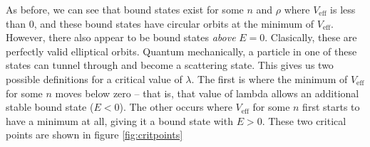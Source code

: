 \documentclass[12pt,twoside]{reedthesis}
\begin{document}
As before, we can see that bound states exist for some $n$ and $\rho$ where $V_{\mathrm{eff}}$ is less than 0, and these bound states have circular orbits at the minimum of $V_{\mathrm{eff}}$. However, there also appear to be bound states \emph{above} $E = 0$. Clasically, these are perfectly valid elliptical orbits. Quantum mechanically, a particle in one of these states can tunnel through and become a scattering state. This gives us two possible definitions for a critical value of $\lambda$.  The first is where the minimum of $V_{\mathrm{eff}}$ for some $n$ moves below zero -- that is, that value of lambda allows an additional stable bound state ($E < 0$). The other occurs where $V_{\mathrm{eff}}$ for some $n$ first starts to have a minimum at all, giving it a bound state with $E>0$. These two critical points are shown in figure \ref{fig:critpoints}
\end{document}

